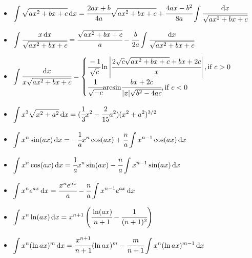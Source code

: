 \begin{itemize}
\item $ \displaystyle \int \sqrt{a x^2  + bx + c} \, { { \text{d} } x} = \cfrac{2ax + b}{4a} \sqrt{a x^2  + bx + c} + \cfrac{4ax - b^2}{8a} \int \cfrac{{ { \text{d} } x}}{\sqrt{a x^2  + bx + c}} $
\item $ \displaystyle \int \cfrac{x \, { { \text{d} } x}}{ \sqrt{a x^2  + bx + c}} = \cfrac{\sqrt{a x^2  + bx + c} }{ a} - \cfrac{b }{ 2a} \int \cfrac{{ { \text{d} } x} }{ \sqrt{a x^2  + bx + c}} $
\item $ \displaystyle \int \cfrac{{ { \text{d} } x} }{ x \sqrt{a x^2  + bx + c}} =
  \begin{cases}
  \displaystyle \cfrac{-1}{ \sqrt{c}} \ln \left\vert\cfrac{2\sqrt{c} \sqrt{ax^2 + bx + c} + bx + 2c }{ x}\right\vert, \text{if $c > 0$} \\
  \displaystyle \cfrac{1 }{ \sqrt{- c}} { \mathop{\text{arcsin}} } \cfrac{bx + 2c }{ \vert x \vert\sqrt{b^2 - 4ac}}, \text{if $c < 0$}
  \end{cases}
$
\item $ \displaystyle \int x^3  \sqrt{x^2 + a^2} \, { { \text{d} } x} = (\cfrac{1}{3} x^2 - \cfrac{2}{15} a^2)(x^2 + a^2)^{3/2} $
\item $ \displaystyle \int x^n \sin (ax) \, { { \text{d} } x} = - \cfrac{1}{a} x^n \cos (ax) + \cfrac{n}{a} \int x^{n-1} \cos (ax) \, { { \text{d} } x} $
\item $ \displaystyle \int x^n \cos (ax) \, { { \text{d} } x} = \cfrac{1}{a} x^n \sin (ax) - \cfrac{n}{a} \int x^{n-1} \sin (ax) \, { { \text{d} } x} $
\item $ \displaystyle \int x^n e^{ax} \, { { \text{d} } x} = \cfrac{x^n e^{ax}}{a} - \cfrac{n}{a} \int x^{n-1} e^{ax} \, { { \text{d} } x} $
\item $ \displaystyle \int x^n \ln (ax) \, { { \text{d} } x} = x^{n+1}\left(\cfrac{\ln (ax) }{ n+1} - \cfrac{1 }{ (n+1)^2}\right) $
\item $ \displaystyle \int x^n (\ln ax)^m \, { { \text{d} } x} = \cfrac{x^{n+1}}{n+1}(\ln ax)^m - \cfrac{m}{n+1}\int x^n (\ln ax)^{m-1} \, { { \text{d} } x} $

\end{itemize}

